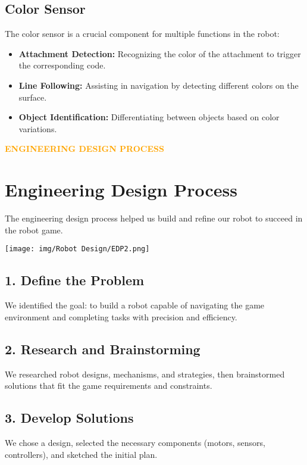 \subsection{Color Sensor}
The color sensor is a crucial component for multiple functions in the robot:

\begin{itemize}
    \item 	\textbf{Attachment Detection:} Recognizing the color of the attachment to trigger the corresponding code.
    \item 	\textbf{Line Following:} Assisting in navigation by detecting different colors on the surface.
    \item 	\textbf{Object Identification:} Differentiating between objects based on color variations.

\end{itemize}

\newpage
\begin{center}
    \huge \textbf{\textcolor{orange}{ENGINEERING DESIGN PROCESS}} \\[0.5cm]
\end{center}
\section{Engineering Design Process}
The engineering design process helped us build and refine our robot to succeed in the robot game.
\vspace{1cm}
\begin{center}
  \texttt{[image: img/Robot Design/EDP2.png]}
\end{center}

\subsection{1. Define the Problem}
We identified the goal: to build a robot capable of navigating the game environment and completing tasks with precision and efficiency.

\subsection{2. Research and Brainstorming}
We researched robot designs, mechanisms, and strategies, then brainstormed solutions that fit the game requirements and constraints.

\subsection{3. Develop Solutions}
We chose a design, selected the necessary components (motors, sensors, controllers), and sketched the initial plan.

